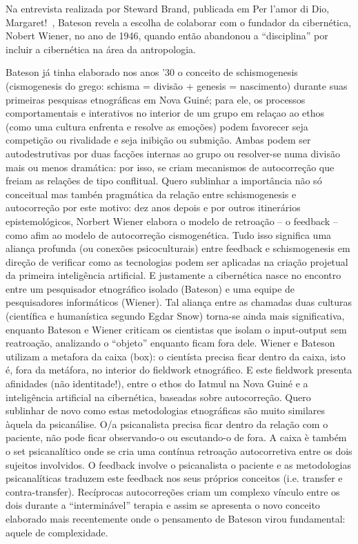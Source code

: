\documentclass[a4paper, 12pt]{article} %
\begin{document}
Na entrevista realizada por Steward Brand, publicada em Per l’amor di Dio, Margaret!~\cite{b6}, Bateson revela a escolha de colaborar com o fundador da cibernética, Nobert Wiener, no ano de 1946, quando então abandonou a “disciplina” por incluir a cibernética na área da antropologia. 

Bateson já tinha elaborado nos anos  ’30 o conceito de schismogenesis (cismogenesis do grego: schisma = divisão +  genesis = nascimento) durante suas primeiras pesquisas etnográficas em Nova Guiné; para ele,  os processos comportamentais e interativos no interior de um grupo em relaçao ao ethos (como uma cultura enfrenta e resolve as emoções) podem favorecer seja competição ou rivalidade e seja inibição ou submição. Ambas  podem ser autodestrutivas por duas facções internas ao grupo ou resolver-se numa divisão mais ou menos dramática: por isso, se criam mecanismos de autocorreção que freiam as relações de tipo conflitual. Quero sublinhar a importância não só conceitual mas tambén pragmática da relação entre schismogenesis e autocorreção por este motivo: dez anos depois e por outros itinerários epistemológicos, Norbert Wiener elabora o modelo de retroação – o feedback – como afim ao modelo de autocorreção cismogenética. Tudo isso significa uma aliança profunda (ou conexões psicoculturais) entre feedback e schismogenesis em direção de verificar como as tecnologias podem ser aplicadas na criação projetual da primeira inteligência artificial. E justamente a cibernética nasce no encontro entre um pesquisador etnográfico isolado (Bateson) e uma equipe de pesquisadores informáticos (Wiener). Tal aliança entre as chamadas duas culturas (científica e humanística segundo Egdar Snow) torna-se ainda mais significativa, enquanto Bateson e Wiener criticam os cientistas que isolam o input-output sem reatroação, analizando o “objeto” enquanto ficam fora dele. Wiener e Bateson utilizam a metafora da caixa (box): o cientísta precisa ficar dentro da caixa, isto é, fora da metáfora, no interior do fieldwork etnográfico. E este fieldwork presenta afinidades (não identitade!), entre o ethos do Iatmul na Nova Guiné e  a inteligência artificial na cibernética, baseadas sobre autocorreção. Quero sublinhar de novo como estas metodologias etnográficas  são muito similares àquela da psicanálise. O/a psicanalista precisa ficar dentro da relação com o paciente, não pode ficar observando-o ou escutando-o de fora. A caixa è também o set psicanalítico onde se cria uma contínua retroação autocorretiva entre os dois sujeitos involvidos. O feedback involve o psicanalista o paciente e as metodologias psicanalíticas traduzem este feedback nos seus próprios conceitos (i.e. transfer e contra-transfer). Recíprocas autocorreções criam um complexo vínculo entre os dois durante a “interminável” terapia e assim se apresenta o novo conceito elaborado mais recentemente onde o pensamento de Bateson virou fundamental: aquele de complexidade.
\end{document}
